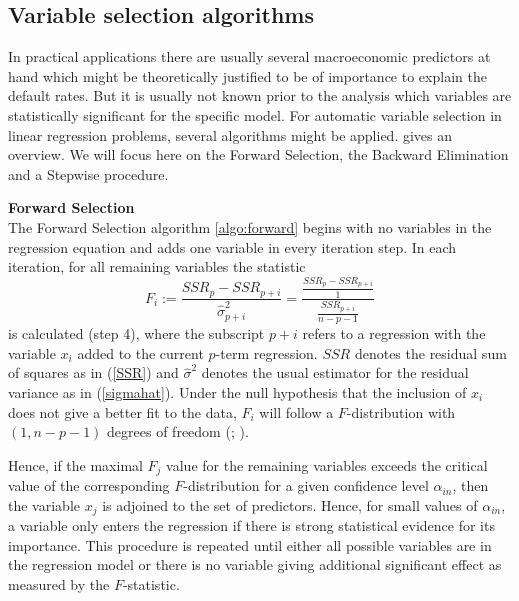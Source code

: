 \documentclass[a4paper, 12pt]{scrreprt}
\begin{document}
\subsection{Variable selection algorithms}\label{par:varselection}

In practical applications there are usually several macroeconomic predictors at hand which might be theoretically justified to be of importance to explain the default rates. 
But it is usually not known prior to the analysis which variables are statistically significant for the specific model.
For automatic variable selection in linear regression problems, several algorithms might be applied. \textcite[chapter 3.2]{hocking1976biometrics} gives an overview.
We will focus here on the Forward Selection, the Backward Elimination and a Stepwise procedure.

\bigskip 
\textbf{Forward Selection} \\
The Forward Selection algorithm \ref{algo:forward} begins with no variables in the regression equation and adds one variable in every iteration step. 
In each iteration, for all remaining variables the statistic
\begin{equation}
F_i := 	 \frac{SSR_p - SSR_{p+i}}{\hat{\sigma}_{p+i}^2} =
\frac{ \frac{SSR_p - SSR_{p+i}}{1} }{ \frac{SSR_{p+i}}{n-p-1}}
\end{equation}
is calculated (step 4), where the subscript $p+i$ refers to a regression with the variable $x_i$ added to the current $p$-term regression. $SSR$ denotes the residual sum of squares as in (\ref{SSR}) and $\hat{\sigma}^2$ denotes the usual estimator for the residual variance as in (\ref{sigmahat}).
Under the null hypothesis that the inclusion of $x_i$ does not give a better fit to the data, $F_i$ will follow a $F$-distribution with $(1, n-p-1)$ degrees of freedom
(\textcite[chapter 4.6]{hocking1976biometrics}; \textcite[chapter 9.7]{degroot2014probability}).

Hence, if the maximal $F_j$ value for the remaining variables exceeds the critical value of the corresponding $F$-distribution for a given confidence level $\alpha_{in}$, then the variable $x_j$ is adjoined to the set of predictors. Hence, for small values of $\alpha_{in}$, a variable only enters the regression if there is strong statistical evidence for its importance.
This procedure is repeated until either all possible variables are in the regression model or there is no variable giving additional significant effect as measured by the $F$-statistic.
\end{document}
